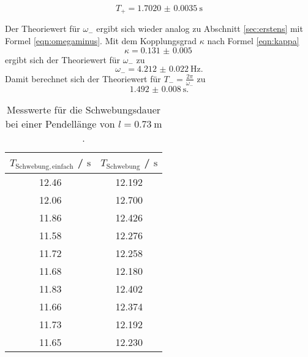 \begin{equation*}
	T_+ = \SI{1.7020(35)}{\second}
\end{equation*}

Der Theoriewert für $\omega_-$ ergibt sich wieder analog zu Abschnitt \ref{sec:erstens} mit
Formel \eqref{eqn:omegaminus}. Mit dem Kopplungsgrad $\kappa$ nach Formel \eqref{eqn:kappa}
\begin{equation*}
	\kappa = \SI{0.131(5)}{}
\end{equation*}
ergibt sich der Theoriewert für $\omega_-$ zu
\begin{equation*}
	\omega_- = \SI{4.212(22)}{\hertz} \mathrm{.}
\end{equation*}
Damit berechnet sich der Theoriewert für $T_- = \frac{2\pi}{\omega_-}$ zu
\begin{equation*}
	\SI{1.492(8)}{\second} \mathrm{.}
\end{equation*}


\begin{table}
	\centering
	\caption{Messwerte für die Schwebungsdauer bei einer Pendellänge von $l=\SI{0.73}{\meter}$.}
	\label{tab:kalou}
	\begin{tabular}{cc}
		\toprule
		$T_{\mathrm{Schwebung,einfach}}$ / $\si{\second}$ & $T_{\mathrm{Schwebung}}$ / $\si{\second}$ \\
		\midrule
		12.46                                             & 12.192                                    \\
		12.06                                             & 12.700                                    \\
		11.86                                             & 12.426                                    \\
		11.58                                             & 12.276                                    \\
		11.72                                             & 12.258                                    \\
		11.68                                             & 12.180                                    \\
		11.83                                             & 12.402                                    \\
		11.66                                             & 12.374                                    \\
		11.73                                             & 12.192                                    \\
		11.65                                             & 12.230                                    \\
		\bottomrule
	\end{tabular}
\end{table}

